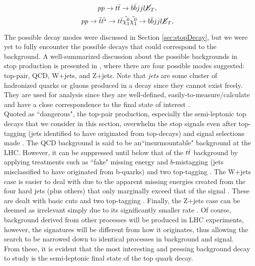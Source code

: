 \begin{equation}
 pp \rightarrow t \Bar{t} \rightarrow b\Bar{b}jjl\cancel{\it{E}}_{T},
 \label{eq:background}
\end{equation}
\begin{equation}
  pp \rightarrow \Tilde{t}\Tilde{t^*} \rightarrow t \Bar{t} \Tilde{\chi^0_1}\Tilde{\chi^0_1} \rightarrow b\Bar{b}jjl\cancel{\it{E}}_{T},
  \label{eq:signal}
\end{equation}


The possible decay modes were discussed in Section \ref{sec:stopDecay}, but we were yet to fully encounter the possible decays that could correspond to the background. A well-summarized discussion about the possible backgrounds in stop production is presented in \cite{plehn2010stop}, where there are four possible modes suggested: top-pair, QCD, W+jets, and Z+jets. Note that \textit{jets} are some cluster of hadronized quarks or gluons produced in a decay since they cannot exist freely. They are used for analysis since they are well-defined, easily-to-measure/calculate and have a close correspondence to the final state of interest \cite{seymour1996jets}. \\

Quoted as ``dangerous", the top-pair production, especially the semi-leptonic top decays that we consider in this section, overwhelm the stop signals even after top-tagging (jets identified to have originated from top-decays) and signal selections made \cite{plehn2010stop}. The QCD background is said to be an``insurmountable" background at the LHC. However, it can be suppressed until below that of the $t\Bar{t}$ background by applying treatments such as ``fake" missing energy and $b$-mistagging (jets misclassified to have originated from b-quarks) and two top-tagging \cite{plehn2010stop}. The W+jets case is easier to deal with due to the apparent missing energies created from the four hard jets (plus others) that only marginally exceed that of the signal \cite{plehn2010stop}. These are dealt with basic cuts and two top-tagging \cite{plehn2010stop}. Finally, the Z+jets case can be deemed as irrelevant simply due to its significantly smaller rate \cite{plehn2010stop}. Of course, background derived from other processes will be produced in LHC experiments, however, the signatures will be different from how it originates, thus allowing the search to be narrowed down to identical processes in background and signal. From these, it is evident that the most interesting and pressing background decay to study is the semi-leptonic final state of the top quark decay. \\

